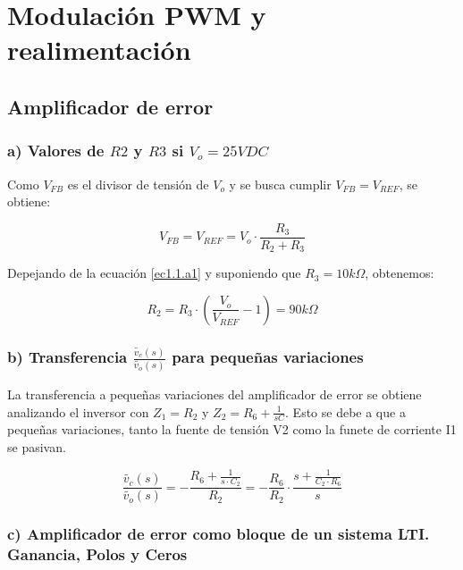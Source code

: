 \documentclass[e4_tp2_main.tex]{subfiles}
\begin{document}

\section{Modulación PWM y realimentación}

\subsection{Amplificador de error}

\subsubsection*{a) Valores de $R2$ y $R3$ si $V_o=25 VDC$}

Como $V_{FB}$ es el divisor de tensi\'on de $V_o$ y se busca cumplir $V_{FB}=V_{REF}$, se obtiene:

\begin{equation}
V_{FB}=V_{REF}= V_o \cdot \frac{R_3}{R_2+R_3}
\label{ec1.1.a1}
\end{equation}


Depejando de la ecuaci\'on \eqref{ec1.1.a1} y suponiendo que $R_3=10k \Omega $, obtenemos:

\begin{equation}
R_2=R_3 \cdot \left( \frac{V_o}{V_{REF}} - 1 \right)=90k \Omega \label{ec1.1.a2}
\end{equation}

\subsubsection*{b) Transferencia  $\frac{ \widetilde{v_c}(s)}{\widetilde{v_o}(s)}$ para pequeñas variaciones} 

La transferencia a pequeñas variaciones del amplificador de error se obtiene analizando el inversor con $Z_1=R_2$ y $Z_2=R_6 + \frac{1}{sC}$. Esto se debe a que a pequeñas variaciones, tanto la fuente de tensi\'on V2 como la funete de corriente I1 se pasivan.

\begin{equation}
\frac{\widetilde{v_c}(s)}{\widetilde{v_o}(s)}=-\frac{R_6 + \frac{1}{s \cdot C_2} }{R_2} = - \frac{R_6}{R_2} \cdot \frac{s+\frac{1}{C_2 \cdot R_6}}{s} \label{ec1.1.b}
\end{equation}

\subsubsection*{c) Amplificador de error como bloque de un sistema LTI. Ganancia, Polos y Ceros}
\end{document}
